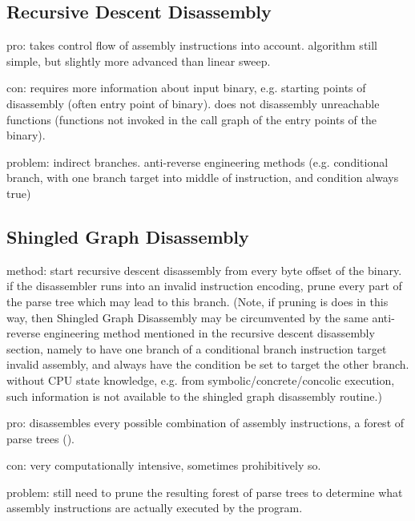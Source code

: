 \subsection{Recursive Descent Disassembly}
\label{sec:recursive_descent_disassembly}


pro: takes control flow of assembly instructions into account. algorithm still simple, but slightly more advanced than linear sweep.

con: requires more information about input binary, e.g. starting points of disassembly (often entry point of binary). does not disassembly unreachable functions (functions not invoked in the call graph of the entry points of the binary).

problem: indirect branches. anti-reverse engineering methods (e.g. conditional branch, with one branch target into middle of instruction, and condition always true)



\subsection{Shingled Graph Disassembly}

method: start recursive descent disassembly from every byte offset of the binary. if the disassembler runs into an invalid instruction encoding, prune every part of the parse tree which may lead to this branch. (Note, if pruning is does in this way, then Shingled Graph Disassembly may be circumvented by the same anti-reverse engineering method mentioned in the recursive descent disassembly section, namely to have one branch of a conditional branch instruction target invalid assembly, and always have the condition be set to target the other branch. without CPU state knowledge, e.g. from symbolic/concrete/concolic execution, such information is not available to the shingled graph disassembly routine.)

pro: disassembles every possible combination of assembly instructions, a forest of parse trees ().

con: very computationally intensive, sometimes prohibitively so.

problem: still need to prune the resulting forest of parse trees to determine what assembly instructions are actually executed by the program.

